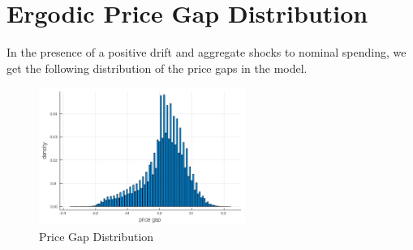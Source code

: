 \section{Ergodic Price Gap Distribution}

In the presence of a positive drift and aggregate shocks to nominal spending, we get the following distribution of the price gaps in the model.
\begin{figure}[H]
    \centering
    \includegraphics[width = 0.6\textwidth]{../tasks/Golosov_lucas/output/price_gap_dist.png}
    \caption{Price Gap Distribution}
    \label{}
\end{figure}
